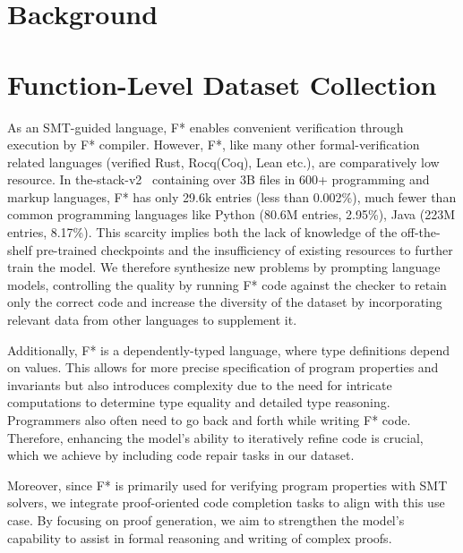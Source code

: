 \section{Background}


\section{Function-Level Dataset Collection}

As an SMT-guided language, F* enables convenient verification through execution by F* compiler. However, F*, like many other formal-verification related languages (verified Rust, Rocq(Coq), Lean etc.), are comparatively low resource.  In the-stack-v2~\cite{lozhkov2024starcoder2stackv2} containing over 3B files in 600+ programming and markup languages,  F* has only 29.6k entries (less than 0.002\%), much fewer than common programming languages like Python (80.6M entries, 2.95\%), Java (223M entries, 8.17\%).
This scarcity implies both the lack of knowledge of the off-the-shelf pre-trained checkpoints and the insufficiency of existing resources to further train the model. We therefore synthesize new problems by prompting language models, controlling the quality by running F* code against the checker to retain only the correct code and increase the diversity of the dataset by incorporating relevant data from other languages to supplement it.

Additionally, F* is a dependently-typed language, where type definitions depend on values. This allows for more precise specification of program properties and invariants but also introduces complexity due to the need for intricate computations to determine type equality and detailed type reasoning. Programmers also often need to go back and forth while writing F* code. Therefore, enhancing the model's ability to iteratively refine code is crucial, which we achieve by including code repair tasks in our dataset. 

Moreover, since F* is primarily used for verifying program properties with SMT solvers, we integrate proof-oriented code completion tasks to align with this use case. By focusing on proof generation, we aim to strengthen the model’s capability to assist in formal reasoning and writing of complex proofs.

